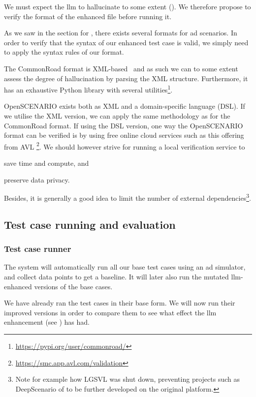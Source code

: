 We must expect the \acrshort{llm} to hallucinate to some extent (). We
therefore propose to verify the format of the enhanced file before running it.

As we saw in the section for , there exists several formats for
\acrshort{ad} scenarios. In order to verify that the syntax of our enhanced test
case is valid, we simply need to apply the syntax rules of our format.

The CommonRoad format is XML-based~\cite[720]{commonRoadOG} and as such we can
to some extent assess the degree of hallucination by parsing the XML structure.
Furthermore, it has an exhaustive Python library with several utilities\footnote{\url{https://pypi.org/user/commonroad/}}.

OpenSCENARIO exists both as XML and a domain-specific language (DSL). If we
utilise the XML version, we can apply the same methodology as for the CommonRoad
format. If using the DSL version, one way
the OpenSCENARIO format can be verified is by using free
online cloud services such as this offering from AVL
\footnote{\url{https://smc.app.avl.com/validation}}. We should however strive for
running a local verification service to \begin{inparaenum}
    \item save time and compute,
    and
    \item preserve data privacy.
\end{inparaenum}
Besides, it is generally a good idea to limit the number of external dependencies\footnote{Note for
    example how LGSVL\cite{lgsvl} was shut down, preventing projects such as DeepScenario of
    \citeauthor{DeepScenario} to be further developed on the original platform.}.

\subsection{Test case running and evaluation}

\subsubsection{Test case runner}

The system will automatically run all
our base test cases using an \acrshort{ad} simulator, and collect data points to get a baseline. It
will later also run the mutated \acrshort{llm}-enhanced versions of the base cases.

We have already ran the test cases in their base form. We will now run their
improved versions in order to compare them to see what effect the \acrshort{llm}
enhancement (see ) has had.

